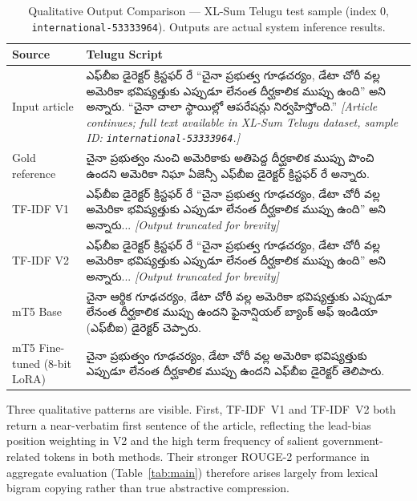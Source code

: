 \documentclass[runningheads]{llncs}
\begin{document}
\begin{table}[!htbp]
\centering
\caption{Qualitative Output Comparison --- XL-Sum Telugu test sample (index 0, \texttt{international-53333964}). Outputs are actual system inference results.}
\label{tab:qualitative}
\scriptsize
\setlength{\tabcolsep}{3pt}
\begin{tabular}{p{2.2cm}p{6.6cm}}
\toprule
\textbf{Source} & \textbf{Telugu Script} \\
\midrule

Input article &
{\telugufont ఎఫ్‌బీఐ డైరెక్టర్ క్రిస్టఫర్ రే “చైనా ప్రభుత్వ గూఢచర్యం, డేటా చోరీ వల్ల అమెరికా భవిష్యత్తుకు ఎప్పుడూ లేనంత దీర్ఘకాలిక ముప్పు ఉంది” అని అన్నారు. “చైనా చాలా స్థాయిల్లో ఆపరేషన్లు నిర్వహిస్తోంది.”}
\textit{[Article continues; full text available in XL-Sum Telugu dataset, sample ID: \texttt{international-53333964}.]} \\
\midrule

Gold reference &
{\telugufont చైనా ప్రభుత్వం నుంచి అమెరికాకు అతిపెద్ద దీర్ఘకాలిక ముప్పు పొంచి ఉందని అమెరికా నిఘా ఏజెన్సీ ఎఫ్‌బీఐ డైరెక్టర్ క్రిస్టఫర్ రే అన్నారు.} \\
\midrule

TF-IDF V1 &
{\telugufont ఎఫ్‌బీఐ డైరెక్టర్ క్రిస్టఫర్ రే “చైనా ప్రభుత్వ గూఢచర్యం, డేటా చోరీ వల్ల అమెరికా భవిష్యత్తుకు ఎప్పుడూ లేనంత దీర్ఘకాలిక ముప్పు ఉంది” అని అన్నారు...}
\textit{[Output truncated for brevity]} \\
\midrule

TF-IDF V2 &
{\telugufont ఎఫ్‌బీఐ డైరెక్టర్ క్రిస్టఫర్ రే “చైనా ప్రభుత్వ గూఢచర్యం, డేటా చోరీ వల్ల అమెరికా భవిష్యత్తుకు ఎప్పుడూ లేనంత దీర్ఘకాలిక ముప్పు ఉంది” అని అన్నారు...}
\textit{[Output truncated for brevity]} \\
\midrule

mT5 Base &
{\telugufont చైనా ఆర్థిక గూఢచర్యం, డేటా చోరీ వల్ల అమెరికా భవిష్యత్తుకు ఎప్పుడూ లేనంత దీర్ఘకాలిక ముప్పు ఉందని ఫైనాన్షియల్ బ్యాంక్ ఆఫ్ ఇండియా (ఎఫ్‌బీఐ) డైరెక్టర్ చెప్పారు.} \\
\midrule

mT5 Fine-tuned (8-bit LoRA) &
{\telugufont చైనా ప్రభుత్వం గూఢచర్యం, డేటా చోరీ వల్ల అమెరికా భవిష్యత్తుకు ఎప్పుడూ లేనంత దీర్ఘకాలిక ముప్పు ఉందని ఎఫ్‌బీఐ డైరెక్టర్ తెలిపారు.} \\
\bottomrule
\end{tabular}
\end{table}

Three qualitative patterns are visible. First, TF-IDF~V1
and TF-IDF~V2 both return a near-verbatim first sentence
of the article, reflecting the lead-bias position weighting
in V2 and the high term frequency of salient
government-related tokens in both methods. Their stronger
ROUGE-2 performance in aggregate evaluation
(Table~\ref{tab:main}) therefore arises largely from lexical
bigram copying rather than true abstractive compression.
\end{document}
